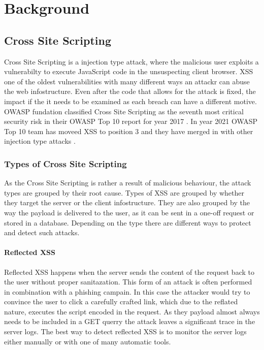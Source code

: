 \chapter{Background}

\section{Cross Site Scripting}
Cross Site Scripting is a injection type attack, where the malicious user exploits a vulnerabilty to execute JavaScript code in the unsuspecting client browser.
XSS one of the oldest vulnerabilities with many different ways an attackr can abuse the web infostructure.
Even after the code that allows for the attack is fixed, the impact if the it needs to be examined as each breach can have a different motive.
OWASP fundation classified Cross Site Scripting as the seventh most critical security risk in their OWASP Top 10 report for year 2017 \cite{owaspTop102017}.
In year 2021 OWASP Top 10 team has moveed XSS to position 3 and they have merged in with other injection type attacks \cite{owaspTop10}.

\subsection{Types of Cross Site Scripting}
As the Cross Site Scripting is rather a result of malicious behaviour, the attack types are grouped by their root cause.
Types of XSS are grouped by whether they target the server or the client infostructure.
They are also grouped by the way the payload is delivered to the user, as it can be sent in a one-off request or stored in a database.
Depending on the type there are different ways to protect and detect such attacks.

\subsubsection{Reflected XSS}
Reflected XSS happens when the server sends the content of the request back to the user without proper sanitazation.
This form of an attack is often performed in combination with a phishing campain.
In this case the attacker would try to convince the user to click a carefully crafted link, which due to the reflated nature, executes the script encoded in the request.
As they payload almost always needs to be included in a GET querry the attack leaves a significant trace in the server logs.
The best way to detect reflected XSS is to monitor the server logs either manually or with one of many automatic tools.

